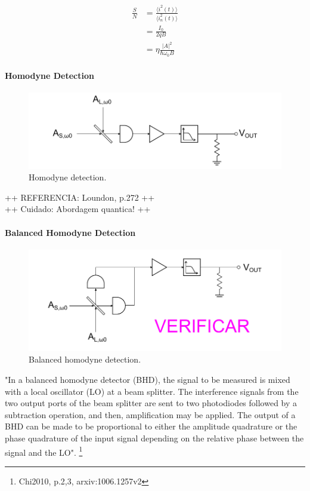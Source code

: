 \begin{bibunit}[plain]
\begin{align}
	\frac{S}{N} &= \frac{\langle i^2(t) \rangle}{\langle i_n^2(t) \rangle} \nonumber\\
                &= \frac{I_0}{2 q B}\nonumber\\
                &= \eta \frac{ |A|^2}{\hbar \omega_0 B}
\end{align}




\paragraph{Homodyne Detection}
\begin{figure}[H]
	\centering
	\includegraphics{./sdf/optical_detection/figures/detection-homodyne.pdf}
	\caption{Homodyne detection.}
\end{figure}
++ REFERENCIA: Loundon, p.272 ++\\
++ Cuidado: Abordagem quantica! ++\\




\paragraph{Balanced Homodyne Detection}
\begin{figure}[H]
	\centering
	\includegraphics{./sdf/optical_detection/figures/detection-balanced-homodyne.pdf}
	\caption{Balanced homodyne detection.}
\end{figure}
"In a balanced homodyne detector (BHD), the signal to be measured is mixed with a local oscillator (LO) at a beam splitter. The interference signals from the two output ports of the beam splitter are sent to two photodiodes followed by a subtraction operation, and then, amplification may be applied. The output of a BHD can be made to be proportional to either the amplitude quadrature or the phase quadrature of the input signal depending on the relative phase between the signal and the LO". \footnote{Chi2010, p.2,3, arxiv:1006.1257v2}





\end{bibunit}

